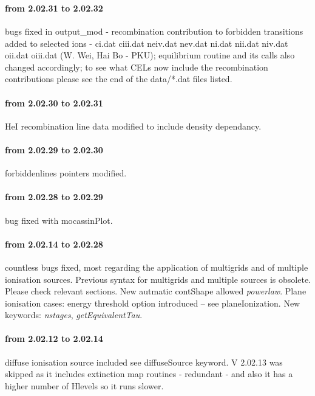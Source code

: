 \documentclass[11pt]{article}
\begin{document}
\pagebreak

\\
\\
\paragraph{from 2.02.31 to 2.02.32} bugs fixed in output\_mod - recombination contribution to forbidden transitions added to selected ions - ci.dat    ciii.dat  neiv.dat  nev.dat   ni.dat    nii.dat   niv.dat   oii.dat   oiii.dat (W. Wei, Hai Bo - PKU); equilibrium routine and its calls also changed accordingly; to see what CELs now include the recombination contributions please see the end of the data/*.dat files listed. 
\paragraph{from 2.02.30 to 2.02.31} HeI recombination line data modified to include density dependancy.
\paragraph{from 2.02.29 to 2.02.30} forbiddenlines pointers modified.
\paragraph{from 2.02.28 to 2.02.29} bug fixed with mocassinPlot.
\paragraph{from 2.02.14 to 2.02.28} countless bugs fixed, most regarding the application of multigrids and of multiple ionisation sources. Previous syntax for multigrids and multiple sources is obsolete. Please check relevant sections. New autmatic contShape allowed {\it powerlaw}. Plane ionisation cases: energy threshold option introduced -- see planeIonization. New keywords: {\it nstages}, {\it getEquivalentTau}.
\paragraph{from 2.02.12 to 2.02.14} diffuse ionisation source included see diffuseSource keyword. V 2.02.13 was skipped as it includes extinction map routines - redundant - and also it has a higher number of Hlevels so it runs slower. 
\end{document}
